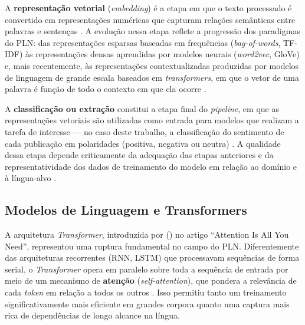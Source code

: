 A \textbf{representação vetorial} (\textit{embedding}) é a etapa em que o texto processado é convertido em representações numéricas que capturam relações semânticas entre palavras e sentenças \cite{jurafsky2026}. A evolução nessa etapa reflete a progressão dos paradigmas do PLN: das representações esparsas baseadas em frequências (\textit{bag-of-words}, TF-IDF) às representações densas aprendidas por modelos neurais (\textit{word2vec}, GloVe) e, mais recentemente, às representações contextualizadas produzidas por modelos de linguagem de grande escala baseados em \textit{transformers}, em que o vetor de uma palavra é função de todo o contexto em que ela ocorre \cite{jurafsky2026,santos2023finbert}.

A \textbf{classificação ou extração} constitui a etapa final do \textit{pipeline}, em que as representações vetoriais são utilizadas como entrada para modelos que realizam a tarefa de interesse --- no caso deste trabalho, a classificação do sentimento de cada publicação em polaridades (positiva, negativa ou neutra) \cite{claro2024cap22}. A qualidade dessa etapa depende criticamente da adequação das etapas anteriores e da representatividade dos dados de treinamento do modelo em relação ao domínio e à língua-alvo \cite{kearney2014,loughran2011}.


\subsection{Modelos de Linguagem e Transformers}
\label{subsec:transformers}

A arquitetura \textit{Transformer}, introduzida por \citeauthor{vaswani2017} (\citeyear{vaswani2017}) no artigo ``Attention Is All You Need'', representou uma ruptura fundamental no campo do PLN. Diferentemente das arquiteturas recorrentes (RNN, LSTM) que processavam sequências de forma serial, o \textit{Transformer} opera em paralelo sobre toda a sequência de entrada por meio de um mecanismo de \textbf{atenção} (\textit{self-attention}), que pondera a relevância de cada \textit{token} em relação a todos os outros \cite{jurafsky2026}. Isso permitiu tanto um treinamento significativamente mais eficiente em grandes corpora quanto uma captura mais rica de dependências de longo alcance na língua.

